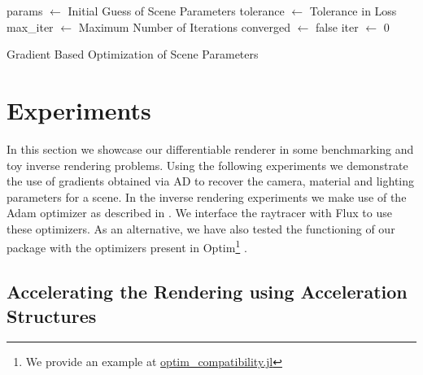 \documentclass{juliacon}
\begin{document}

\begin{algorithm}[!htb]
\DontPrintSemicolon
\SetAlgoLined
{}
params $\gets$ Initial Guess of Scene Parameters\;
tolerance $\gets$ Tolerance in Loss\;
max\_iter $\gets$ Maximum Number of Iterations\;
converged $\gets$ false\;
iter $\gets$ 0\;
\;
\caption{Gradient Based Optimization of Scene Parameters}
\label{alg:inv_render}
\end{algorithm}

\section{Experiments}

In this section we showcase our differentiable renderer in some benchmarking and toy inverse rendering problems. Using the following experiments we demonstrate the use of gradients obtained via AD to recover the camera, material and lighting parameters for a scene. In the inverse rendering experiments we make use of the Adam optimizer as described in \cite{kingma2014adam}. We interface the raytracer with Flux to use these optimizers. As an alternative, we have also tested the functioning of our package with the optimizers present in Optim\footnote{\raggedright{We provide an example at \href{https://github.com/avik-pal/RayTracer.jl/examples/optim\_compatibility.jl}{optim\_compatibility.jl}}} \cite{K2018Optim}.

\subsection{Accelerating the Rendering using Acceleration Structures}
\end{document}
